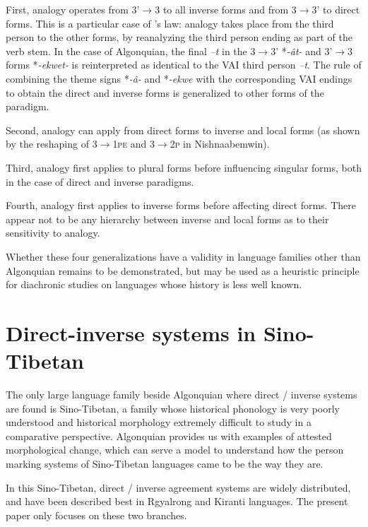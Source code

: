\documentclass[twoside,a4paper,11pt]{article}
\newcommand{\ipa}[1]{{\phon\textit{#1}}}
\newcommand{\Σ}{\greek{Σ}}
\begin{document}
First, analogy operates from 3'$\rightarrow$3 to all inverse forms and from 3$\rightarrow$3' to direct forms. This is a particular case of   \citealt{watkins62celtic}'s law: analogy takes place from the third person to the other forms, by reanalyzing the third person ending as part of the verb stem. In the case of Algonquian, the final  \ipa{--t}  in the 3$\rightarrow$3' *\ipa{-ât-} and 3'$\rightarrow$3 forms *\ipa{-ekwet-} is reinterpreted as identical to the VAI third person \ipa{--t}.  The rule of combining the  theme signs *\ipa{-â-} and *\ipa{-ekwe}   with the corresponding VAI endings to obtain the direct and inverse forms  is generalized to other forms of the paradigm.


 
Second, analogy can apply from direct forms to inverse and  local forms (as shown by the reshaping of \textsc{3$\rightarrow$1pe} and \textsc{3$\rightarrow$2p} in Nishnaabemwin).

Third,  analogy first applies to plural forms before influencing singular forms, both in the case of direct and inverse paradigms.

Fourth, analogy first applies   to inverse forms before affecting direct forms. There appear not to be any hierarchy between inverse and local forms as to their sensitivity to analogy.
 
 
 Whether these four generalizations have a validity in language families other than Algonquian remains to be demonstrated, but may be used as a heuristic principle for diachronic studies on languages whose history is less well known.  
 
\section{Direct-inverse systems in Sino-Tibetan}

 
The only   large language family beside Algonquian where direct / inverse systems are found is Sino-Tibetan, a family whose historical phonology is very poorly understood and historical morphology extremely difficult to study in a comparative perspective. Algonquian provides us with examples of attested morphological change, which can serve a model to understand how the person marking systems of Sino-Tibetan languages came to be the way they are.

In this Sino-Tibetan,  direct / inverse agreement systems are widely distributed, and have been described best in Rgyalrong and Kiranti languages. The present paper only focuses on these two branches.
\end{document}
